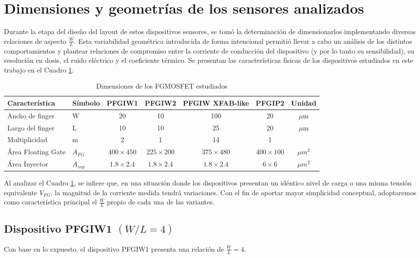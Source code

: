\documentclass[12pt,a4paper,oneside]{book}
\begin{document}
\section{Dimensiones y geometrías de los sensores analizados}
Durante la etapa del diseño del layout de estos dispositivos sensores, se tomó la determinación de dimensionarlos implementando diversas relaciones de aspecto $\frac{W}{L}$. Esta variabilidad geométrica introducida de forma intencional permitió llevar a cabo un análisis de los distintos comportamientos y plantear relaciones de compromiso entre la corriente de conducción del dispositivo (y por lo tanto su sensibilidad), su resolución en dosis, el ruido eléctrico y el coeficiente térmico. Se presentan las características físicas de los dispositivos estudiados en este trabajo en el Cuadro \ref{tab:dimensiones}.

\begin{table}[h]
\centering
\begin{tabular}{llccccc}
\toprule
Característica & Símbolo & PFGIW1 & PFGIW2 & PFGIW XFAB-like & PFGIP2 & Unidad \\
\midrule
Ancho de finger & W & 20 & 10 & 100 & 20 & $\mu$m \\
Largo del finger & L & 10 & 10 & 25 & 20 & $\mu$m \\
Multiplicidad & m & 2 & 1 & 14 & 1 & \\
Área Floating Gate & $A_{FG}$ & $400\times450$ & $225\times200$ & $375\times480$ & $400\times100$ & $\mu m^{2}$ \\
Área Inyector & $A_{iny}$ & $1.8\times2.4$ & $1.8\times2.4$ & $1.8\times2.4$ & $6\times6$ & $\mu m^{2}$ \\
\bottomrule
\end{tabular}
\caption{Dimensiones de los FGMOSFET estudiados}
\label{tab:dimensiones}
\end{table}

Al analizar el Cuadro \ref{tab:dimensiones}, se infiere que, en una situación donde los dispositivos presentan un idéntico nivel de carga o una misma tensión equivalente $V_{FG}$, la magnitud de la corriente medida tendrá variaciones. Con el fin de aportar mayor simplicidad conceptual, adoptaremos como característica principal el $\frac{W}{L}$ propio de cada una de las variantes.

\subsection{Dispositivo PFGIW1 $(W/L=4)$}
Con base en lo expuesto, el dispositivo PFGIW1 presenta una relación de $\frac{W}{L}=4$.
\end{document}
